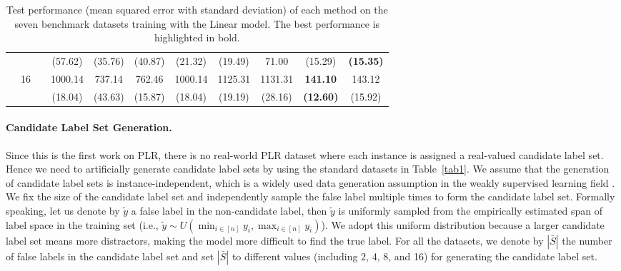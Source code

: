 \documentclass[letterpaper]{article} %
\begin{document}
\begin{table}[!t]
{\begin{tabular}{clcccccccc|cc}
\multicolumn{2}{c}{}                             &                       &                             & (57.62)                   & (35.76)                   & (40.87)                     & (21.32)                   & (19.49)                   & 71.00                       & (15.29)             & \textbf{(15.35)}      \\
\multicolumn{2}{c}{}                             & \multirow{2}{*}{16}   &                             & 1000.14                   & 737.14                    & 762.46                      & 1000.14                   & 1125.31                   & 1131.31                     & \textbf{141.10}     & 143.12                \\
\multicolumn{2}{c}{}                             &                       &                             & (18.04)                   & (43.63)                   & (15.87)                     & (18.04)                   & (19.19)                   & (28.16)                     & \textbf{(12.60)}    & (15.92)              
\\
\bottomrule
\end{tabular}
}
\caption{Test performance (mean squared error with standard deviation) of each method on the seven benchmark datasets training with the Linear model. The best performance is highlighted in bold.}
\label{tab3}
\end{table}
\paragraph{Candidate Label Set Generation.} Since this is the first work on PLR, there is no real-world PLR dataset where each instance is assigned a real-valued candidate label set. Hence we need to artificially generate candidate label sets by using the standard datasets in Table~\ref{tab1}. We assume that the generation of candidate label sets is instance-independent, which is a widely used data generation assumption in the weakly supervised learning field \cite{patrini2017making,ghosh2017robust,ishida2019complementary,feng2020provably}. We fix the size of the candidate label set and independently sample the false label multiple times to form the candidate label set. Formally speaking, let us denote by $\widetilde{y}$ a false label in the non-candidate label, then $\widetilde{y}$ is uniformly sampled from the empirically estimated span of label space in the training set (i.e., $\widetilde{y}\sim U(\min_{i\in [n]}y_i, \max_{i\in [n]}y_i)$). We adopt this uniform distribution because a larger candidate label set means more distractors, making the model more difficult to find the true label. For all the datasets, we denote by $|\bar{S}|$ the number of false labels in the candidate label set and set $|\bar{S}|$ to different values (including 2, 4, 8, and 16) for generating the candidate label set.
\end{document}
